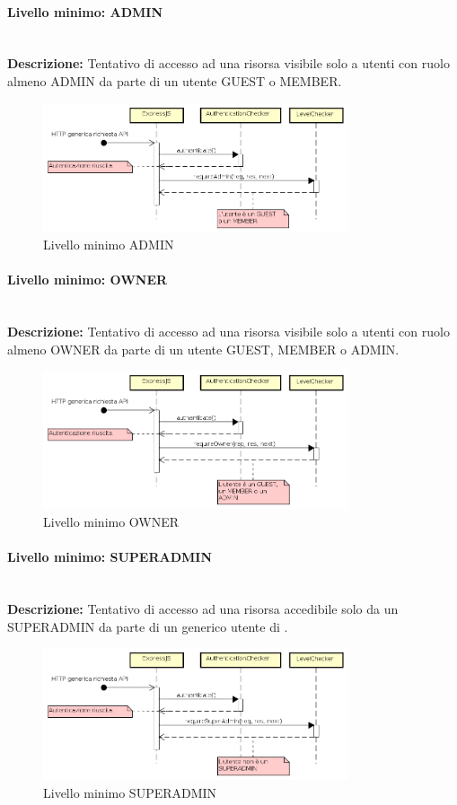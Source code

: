 \paragraph{Livello minimo: ADMIN} \mbox{} \\
\textbf{Descrizione:} Tentativo di accesso ad una risorsa visibile solo a utenti con ruolo almeno ADMIN da parte di un utente GUEST o MEMBER.
\begin{figure}[H]
\centering
\includegraphics[width=0.8\textwidth]{res/sections/backend/sequence/requireAdminFallita.png}
\caption{Livello minimo ADMIN}
\end{figure}
\paragraph{Livello minimo: OWNER}  \mbox{} \\
\textbf{Descrizione:} Tentativo di accesso ad una risorsa visibile solo a utenti con ruolo almeno OWNER da parte di un utente GUEST, MEMBER o ADMIN.
\begin{figure}[H]
\centering
\includegraphics[width=0.8\textwidth]{res/sections/backend/sequence/requireOwnerFallita.png}
\caption{Livello minimo OWNER}
\end{figure}
\paragraph{Livello minimo: SUPERADMIN}  \mbox{} \\
\textbf{Descrizione:} Tentativo di accesso ad una risorsa accedibile solo da un SUPERADMIN da parte di un generico utente di .
\begin{figure}[H]
\centering
\includegraphics[width=0.8\textwidth]{res/sections/backend/sequence/requireSuperAdminFallita.png}
\caption{Livello minimo SUPERADMIN}
\end{figure}
\newpage
